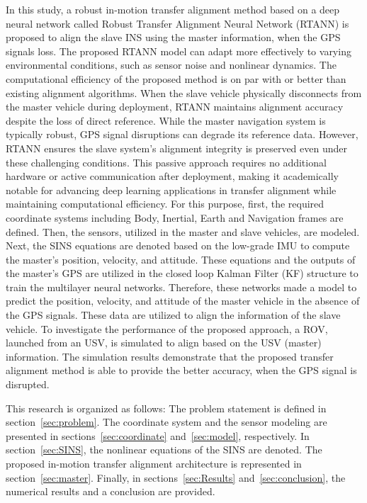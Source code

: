 \documentclass[3p]{elsarticle}
\begin{document}
In this study, a robust in-motion transfer alignment method
based on a deep neural network called Robust Transfer Alignment Neural Network (RTANN) is proposed
to align the slave INS using the master information, when
the GPS signals loss. 
The proposed RTANN model can adapt more effectively to varying environmental conditions, such as sensor noise and nonlinear dynamics. The computational efficiency of the proposed method is on par with or better than existing alignment algorithms. When the slave vehicle physically disconnects from the master vehicle during deployment, RTANN maintains alignment accuracy despite the loss of direct reference. While the master navigation system is typically robust, GPS signal disruptions can degrade its reference data. However, RTANN ensures the slave system's alignment integrity is preserved even under these challenging conditions. This passive approach requires no additional hardware or active communication after deployment, making it academically notable for advancing deep learning applications in transfer alignment while maintaining computational efficiency.
For this purpose, first, the required coordinate systems including Body, Inertial, Earth and Navigation
frames are defined. Then, the sensors, utilized
in the master and slave vehicles, are modeled. Next, the
SINS equations are denoted based on the low-grade
IMU to compute the master's position, velocity, and attitude.
These equations and the outputs of the master's GPS are utilized in the closed
loop Kalman Filter (KF) structure to train the multilayer neural
networks. Therefore, these networks made a model to
predict the position, velocity, and attitude of the master vehicle
in the absence of the GPS signals. These data are utilized to
align the information of the slave vehicle. To investigate the
performance of the proposed approach, a ROV,
launched from an USV, is simulated to align based on the USV (master) information. The simulation
results demonstrate that the proposed transfer alignment method
is able to provide the better accuracy, when the GPS signal
is disrupted.

This research is organized as follows: The problem statement is defined in section~\ref{sec:problem}. The coordinate system and the sensor modeling are presented in sections~\ref{sec:coordinate} and~\ref{sec:model}, respectively. In section~\ref{sec:SINS}, the nonlinear equations of the SINS are denoted.
The proposed in-motion transfer alignment architecture is represented in section~\ref{sec:master}. Finally, in sections~\ref{sec:Results} and~\ref{sec:conclusion}, the numerical results and a conclusion are provided.
\end{document}
